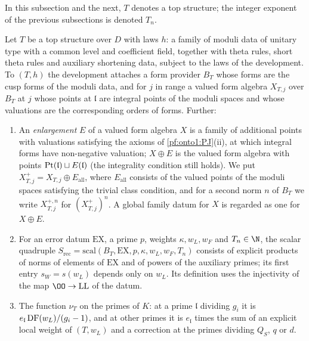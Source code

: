 In this subsection and the next, $T$ denotes a top structure; the integer exponent of the previous subsections is
denoted $T_n$.

\begin{definition}\label{pf:onto1:record-def}
Let $T$ be a top structure over $D$ with laws $h$: a family of moduli data of unitary type with a common level and
coefficient field, together with theta rules, short theta rules and auxiliary shortening data, subject to the laws of
the development. To $(T,h)$ the development attaches a form provider $B_T$ whose forms are the cusp forms of the
moduli data, and for $j$ in range a valued form algebra $X_{T,j}$ over $B_T$ at $j$ whose points at $\mathfrak l$ are
integral points of the moduli spaces and whose valuations are the corresponding orders of forms. Further:
\begin{enumerate}[label=(\roman*)]
\item An \emph{enlargement} $E$ of a valued form algebra $X$ is a family of additional points with valuations
satisfying the axioms of \cref{pf:onto1:PJ}(ii), at which integral forms have non-negative valuation; $X\oplus E$ is
the valued form algebra with points $\operatorname{Pt}(\mathfrak l)\sqcup E(\mathfrak l)$ (the integrality condition still holds).
We put $X^+_{T,j}=X_{T,j}\oplus E_{\mathrm{all}}$, where $E_{\mathrm{all}}$ consists of the valued points of the moduli spaces
satisfying the trivial class condition, and for a second norm $n$ of $B_T$ we write $X^{+,n}_{T,j}$ for $(X^+_{T,j})^n$. A
global family datum for $X$ is regarded as one for $X\oplus E$.
\item For an error datum $\mathrm{EX}$, a prime $p$, weights $\kappa,w_L,w_F$ and $T_n\in\N$, the scalar quadruple
$S_{\mathrm{rec}}=\mathrm{scal}(B_T,\mathrm{EX},p,\kappa,w_L,w_F,T_n)$ consists of explicit products of norms of elements of
$\mathrm{EX}$ and of powers of the auxiliary primes; its first entry $s_W=s(w_L)$ depends only on $w_L$. Its definition uses
the injectivity of the map $\OO\to\mathrm{LL}$ of the datum.
\item The function $\nu_T$ on the primes of $K$: at a prime $\mathfrak l$ dividing $g_i$ it is
$e_{\mathfrak l}\operatorname{DF}(w_L)/(g_i-1)$, and at other primes it is $e_{\mathfrak l}$ times the sum of an explicit local weight
of $(T,w_L)$ and a correction at the primes dividing $Q_S$, $q$ or $d$.
\end{enumerate}
\end{definition}

